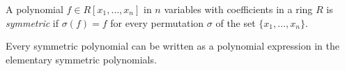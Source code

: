 \documentclass[12pt]{article}
\begin{document}
A polynomial $f \in R[x_1, \dots, x_n]$ in $n$ variables with coefficients in a ring $R$ is {\em symmetric} if $\sigma(f) = f$ for every permutation $\sigma$ of the set $\{x_1, \dots, x_n\}$.

Every symmetric polynomial can be written as a polynomial expression in the elementary symmetric polynomials.
\end{document}
